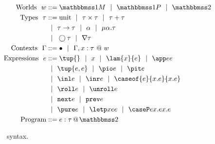 
\begin{figure}
\begin{abstrsyn}
\[\begin{aligned}
\text{Worlds}\ \ 
\world &::= \bbonem \gbar \bbonep \gbar \bbtwo  \\
%
\text{Types}\ \ 
\type &::= \text{unit}%
 \gbar \type \times \type
 \gbar \type + \type \\
&\gbar \type \to \type
 \gbar \alpha \gbar \mu \alpha.\tau \\
&\gbar \fut \type 
 \gbar \curr \type \\
%
\text{Contexts}\ \ 
\context &::=\emptyC
 \gbar \context, x:\tau~@~w \\
%
\text{Expressions}\ \ 
\expr &::= \tup{}\gbar\var%
 \gbar \lam {\var}{\expr} 
 \gbar \app \expr \expr \\
&\gbar \tup{\expr, \expr} 
 \gbar \pio \expr 
 \gbar \pit \expr \\
&\gbar \inl \expr 
 \gbar \inr \expr
 \gbar \caseof {\expr}{\var.\expr}{\var.\expr}
\\ %
&\gbar \roll e
 \gbar \unroll e\\
&\gbar \next \expr 
 \gbar \prev \expr \\
&\gbar \pure \expr 
 \gbar \letp \var \expr \expr
 \gbar \caseP \expr {\var.\expr} {\var.\expr} \\
\text{Program} &::= \coltwo e \tau \\
\end{aligned}\]
\end{abstrsyn}
\caption{\lang~syntax.}
\label{fig:grammar}
\end{figure}
